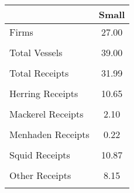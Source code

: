 \begin{tabular}{l*{1}{c}}
\hline\hline
                &    Small\\
\hline
Firms           &    27.00\\
                &         \\
Total Vessels   &    39.00\\
                &         \\
Total Receipts  &    31.99\\
                &         \\
Herring Receipts&    10.65\\
                &         \\
Mackerel Receipts&     2.10\\
                &         \\
Menhaden Receipts&     0.22\\
                &         \\
Squid Receipts  &    10.87\\
                &         \\
Other Receipts  &     8.15\\
                &         \\
\hline\hline
\end{tabular}

